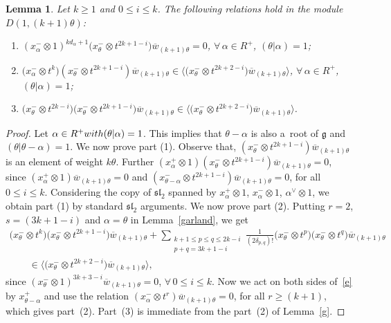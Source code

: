 \documentclass[10pt,a4paper]{amsart}
\newtheorem{lemma}{Lemma}
\begin{document}
\begin{lemma}
\label{crucial}
Let $k\geq 1$ and $0\leq i \leq k$. The following relations hold in the module $D(1,(k+1)\theta)$:
\begin{enumerate}\itemsep=0pt
\item[$1)$] $(x^{-}_{\alpha} \otimes 1)^{kd_{\alpha}+1}\big(x^{-}_{\theta} \otimes t^{2k+1-i}\big) \overline{w}_{(k+1)\theta}=0$,
$\forall\, \alpha \in R^{+}$, $(\theta|\alpha)=1$;
\item[$2)$] $\big(x^{-}_{\alpha} \otimes t^{k}\big) (x^{-}_{\theta} \otimes t^{2k+1-i}) \overline{w}_{(k+1)\theta} \in
\big\langle \big(x^{-}_{\theta} \otimes t^{2k+2-i}\big) \overline{w}_{(k+1)\theta} \big\rangle$,
$\forall\, \alpha \in R^{+}$, $(\theta|\alpha)=1$;
\item[$3)$] $\big(x^{-}_{\theta} \otimes t^{2k-i}\big) \big(x^{-}_{\theta} \otimes t^{2k+1-i}\big) \overline{w}_{(k+1)\theta}
\in
\big\langle \big(x^{-}_{\theta} \otimes t^{2k+2-i}\big) \overline{w}_{(k+1)\theta} \big\rangle$.
\end{enumerate}
\end{lemma}

\begin{proof}
Let $ \alpha \in R^{+} \textup{with} (\theta|\alpha)=1$. This implies that $\theta-\alpha$ is also a~root of
$\mathfrak{g}$ and $(\theta|\theta-\alpha)=1$. We now prove part (1).
Observe that, $(x^{-}_{\theta} \otimes t^{2k+1-i}) \overline{w}_{(k+1)\theta}$ is an element of weight $k\theta$.
Further $(x^{+}_{\alpha} \otimes 1) (x^{-}_{\theta} \otimes t^{2k+1-i}) \overline{w}_{(k+1)\theta}=0$, since
$(x^{+}_{\alpha} \otimes 1)\overline{w}_{(k+1)\theta}=0$ and $(x^{-}_{\theta-\alpha} \otimes t^{2k+1-i}) \overline{w}_{(k+1)\theta}=0$,
for all $0\leq i \leq k$.
Considering the copy of $\mathfrak{sl}_2$ spanned by $x^{+}_{\alpha} \otimes 1$, $x^{-}_{\alpha} \otimes 1$,
$\alpha^{\vee}\otimes 1$, we obtain part (1) by standard $\mathfrak{sl}_2$ arguments.
We now prove part (2).
Putting $r=2$, $s=(3k+1-i)$ and $\alpha=\theta$ in Lemma~\ref{garland}, we get
\begin{gather}
\big(x^{-}_{\theta} \otimes t^{k}\big) \big(x^{-}_{\theta} \otimes t^{2k+1-i}\big) \overline{w}_{(k+1)\theta} +
\sum\limits_{\substack{k+1\leq p\leq q \leq 2k-i\\p+q= 3k+1-i}}
\frac{1}{(2\delta_{p, q})!} \big(x^{-}_{\theta} \otimes t^{p}\big) \big(x^{-}_{\theta} \otimes t^{q}\big)
\overline{w}_{(k+1)\theta}
\nonumber\\
\qquad{}
\in
\big\langle\big(x^{-}_{\theta}\otimes t^{2k+2-i}\big) \overline{w}_{(k+1)\theta} \big\rangle, \label{e}
\end{gather}
since $(x^{-}_{\theta}\otimes 1)^{3k+3-i}\overline{w}_{(k+1)\theta}=0$, $\forall\, 0\leq i \leq k$.
Now we act on both sides of~\eqref{e} by $x^{+}_{\theta-\alpha}$ and use the relation $(x^{-}_{\alpha} \otimes t^r) \overline{w}_{(k+1)\theta}=0$,
for all $r\geq(k+1)$, which gives part~(2).
Part~(3) is immediate from the part~(2) of Lemma~\ref{g}.
\end{proof}
\end{document}
